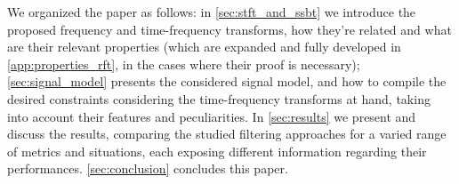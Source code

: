 We organized the paper as follows:
in \cref{sec:stft_and_ssbt} we introduce the proposed frequency and time-frequency transforms, how they're related and what are their relevant properties (which are expanded and fully developed in \cref{app:properties_rft}, in the cases where their proof is necessary);
\cref{sec:signal_model} presents the considered signal model, and how to compile the desired constraints considering the time-frequency transforms at hand, taking into account their features and peculiarities.
In \cref{sec:results} we present and discuss the results, comparing the studied filtering approaches for a varied range of metrics and situations, each exposing different information regarding their performances.
\cref{sec:conclusion} concludes this paper.